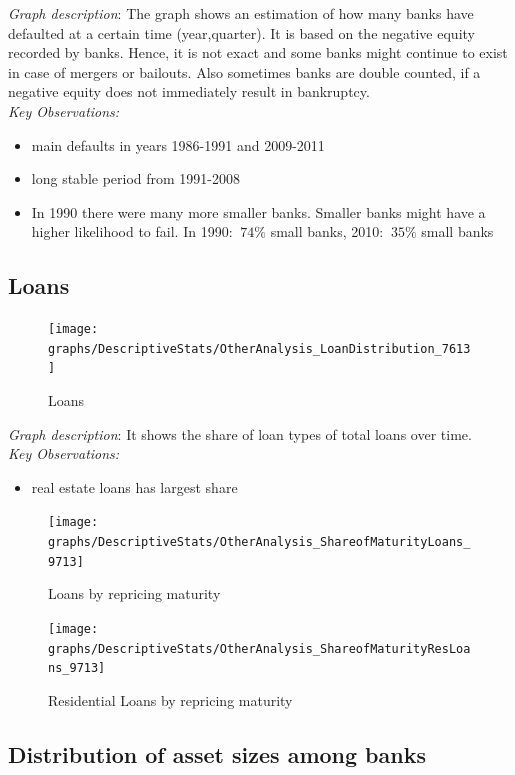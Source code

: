 \documentclass[12pt, a4paper]{article} %
\begin{document}
\noindent \textit{Graph description}: The graph shows an estimation of how many banks have defaulted at a certain time (year,quarter). It is based on the negative equity recorded by banks. Hence, it is not exact and some banks might continue to exist in case of mergers or bailouts. Also sometimes banks are double counted, if a negative equity does not immediately result in bankruptcy. \\
\noindent \textit{Key Observations:}
\begin{itemize}
\item main defaults in years 1986-1991 and 2009-2011
\item long stable period from 1991-2008
\item In 1990 there were many more smaller banks. Smaller banks might have a higher likelihood to fail. In 1990:  $~74\%$ small banks, 2010: $~35\%$ small banks 
\end{itemize}


\subsection{Loans}

\begin{figure}[hbtp]
\centering
\caption{Loans}
\texttt{[image: graphs/DescriptiveStats/OtherAnalysis\_LoanDistribution\_7613]}
\end{figure}

\noindent \textit{Graph description}: It shows the share of loan types of total loans over time.\\

\noindent \textit{Key Observations:}
\begin{itemize}
\item real estate loans has largest share

\end{itemize}

\begin{figure}[hbtp]
\centering
\caption{Loans by repricing maturity}
\texttt{[image: graphs/DescriptiveStats/OtherAnalysis\_ShareofMaturityLoans\_9713]}
\end{figure}


\begin{figure}[hbtp]
\centering
\caption{Residential Loans by repricing maturity}
\texttt{[image: graphs/DescriptiveStats/OtherAnalysis\_ShareofMaturityResLoans\_9713]}
\end{figure}

\subsection{Distribution of asset sizes among banks}
\end{document}
